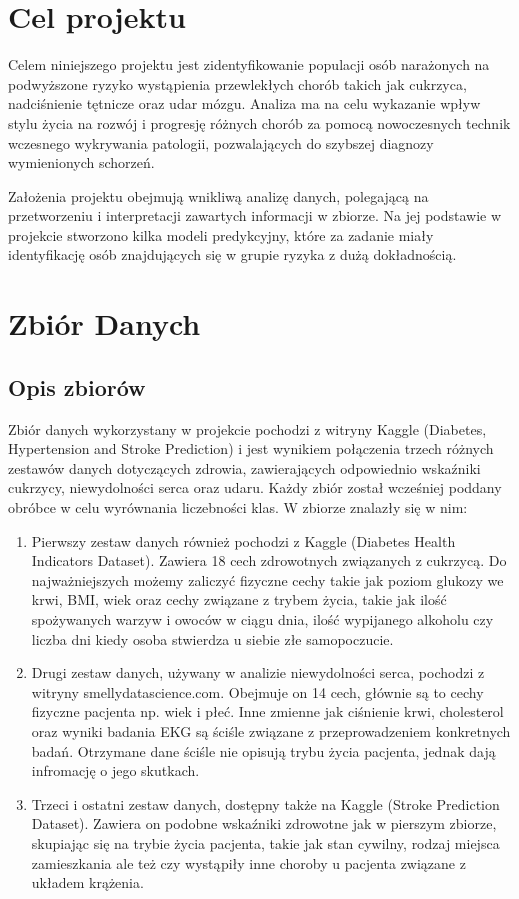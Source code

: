\documentclass[onecolumn,12pt]{article}
\begin{document}
\newpage

\section{Cel projektu}

Celem niniejszego projektu jest zidentyfikowanie populacji osób narażonych na podwyższone ryzyko
wystąpienia przewlekłych chorób takich jak cukrzyca, nadciśnienie tętnicze oraz udar mózgu. Analiza ma na celu wykazanie wpływ stylu życia na rozwój i progresję różnych chorób za pomocą nowoczesnych technik wczesnego wykrywania patologii, pozwalających do szybszej diagnozy wymienionych schorzeń.

Założenia projektu obejmują wnikliwą analizę danych, polegającą na przetworzeniu i interpretacji zawartych informacji w zbiorze. Na jej podstawie w projekcie stworzono kilka modeli predykcyjny, które za zadanie miały identyfikację osób znajdujących się w grupie ryzyka z dużą dokładnością.
        
\section{Zbiór Danych}

\subsection{Opis zbiorów}
Zbiór danych wykorzystany w projekcie pochodzi z witryny Kaggle (Diabetes, Hypertension and Stroke Prediction) i jest wynikiem połączenia trzech różnych zestawów danych dotyczących zdrowia, zawierających odpowiednio wskaźniki cukrzycy, niewydolności serca oraz udaru. Każdy zbiór został wcześniej poddany obróbce w celu wyrównania liczebności klas. W zbiorze znalazły się w nim:

\begin{enumerate}
  \item Pierwszy zestaw danych również pochodzi z Kaggle (Diabetes Health Indicators Dataset). Zawiera 18 cech zdrowotnych związanych z cukrzycą. Do najważniejszych możemy zaliczyć fizyczne cechy takie jak poziom glukozy we krwi, BMI, wiek oraz cechy związane z trybem życia, takie jak ilość spożywanych warzyw i owoców w ciągu dnia, ilość wypijanego alkoholu czy liczba dni kiedy osoba stwierdza u siebie złe samopoczucie. 
  
  \item Drugi zestaw danych, używany w analizie niewydolności serca, pochodzi z witryny smellydatascience.com. Obejmuje on 14 cech,  głównie są to cechy fizyczne pacjenta np. wiek i płeć. Inne zmienne jak ciśnienie krwi, cholesterol oraz wyniki badania EKG są ściśle związane z przeprowadzeniem konkretnych badań. Otrzymane dane ściśle nie opisują trybu życia pacjenta, jednak dają infromację o jego skutkach.
  
  \item Trzeci i ostatni zestaw danych, dostępny także na Kaggle (Stroke Prediction Dataset). Zawiera on podobne wskaźniki zdrowotne jak w pierszym zbiorze, skupiając się na trybie życia pacjenta, takie jak stan cywilny, rodzaj miejsca zamieszkania ale też czy wystąpiły inne choroby u pacjenta związane z układem krążenia. 
\end{enumerate}
\end{document}
